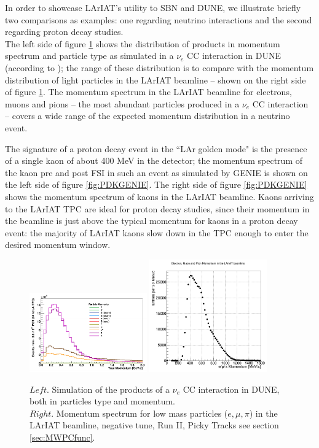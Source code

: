 In order to showcase LArIAT's utility to SBN and DUNE, we illustrate briefly two comparisons as examples: one regarding neutrino interactions and the second regarding proton decay studies.\\
The left side of figure \ref{fig:NuSimulation} shows the distribution of products in momentum spectrum and particle type as simulated in a $\nu_e$ CC interaction in DUNE (according to \cite{LeiguideOliveira:1953730}); the range of these distribution is to compare with  the momentum distribution of light particles in the LArIAT beamline -- shown on the right side of figure \ref{fig:NuSimulation}. The momentum spectrum in the LArIAT beamline for electrons, muons and pions -- the most abundant particles produced in  a $\nu_e$ CC interaction -- covers a wide range of the expected momentum distribution in a neutrino event.


The signature of a proton decay event in the ``LAr golden mode" is the presence of a single kaon of about 400 MeV in the detector; the momentum spectrum of the kaon pre and post FSI in such an event as simulated by GENIE is shown on the left side of figure \ref{fig:PDKGENIE}. The right side of figure \ref{fig:PDKGENIE} shows the momentum spectrum of kaons in the LArIAT beamline. Kaons arriving to the LArIAT TPC are ideal for proton decay studies, since their momentum in the beamline is just above the typical momentum for kaons in a proton decay event: the majority of LArIAT kaons slow down in the TPC enough to enter the desired momentum window.


\begin{figure}[hbpt]
\centering
\includegraphics[width=0.45\textwidth]{Chapter-2/Images/NueCCSim.png}	
\includegraphics[width=0.45\textwidth]{Chapter-2/Images/momentumPiMuE.png}
\caption{$Left$. Simulation of the products of a $\nu_e$ CC interaction in DUNE, both in particles type and momentum. \\
$Right$. Momentum spectrum for low mass particles ($e,\mu,\pi$) in the LArIAT beamline,  negative tune, Run II, Picky Tracks see section \ref{sec:MWPCfunc}. }
\label{fig:NuSimulation}
\end{figure}


